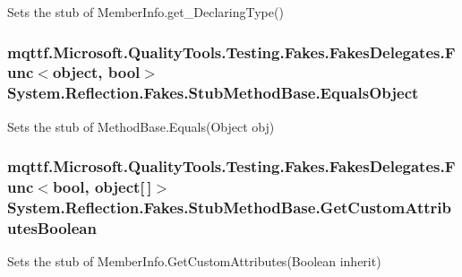 Sets the stub of Member\-Info.\-get\-\_\-\-Declaring\-Type()

\hypertarget{class_system_1_1_reflection_1_1_fakes_1_1_stub_method_base_a84e14ca18193fe6f46b067331e2e2517}{
\subsubsection[{Equals\-Object}]{\setlength{\rightskip}{0pt plus 5cm}mqttf.\-Microsoft.\-Quality\-Tools.\-Testing.\-Fakes.\-Fakes\-Delegates.\-Func$<$object, bool$>$ System.\-Reflection.\-Fakes.\-Stub\-Method\-Base.\-Equals\-Object}}\label{class_system_1_1_reflection_1_1_fakes_1_1_stub_method_base_a84e14ca18193fe6f46b067331e2e2517}


Sets the stub of Method\-Base.\-Equals(\-Object obj)

\hypertarget{class_system_1_1_reflection_1_1_fakes_1_1_stub_method_base_a47392a9d2d8944b9ec532f8330a71e78}{
\subsubsection[{Get\-Custom\-Attributes\-Boolean}]{\setlength{\rightskip}{0pt plus 5cm}mqttf.\-Microsoft.\-Quality\-Tools.\-Testing.\-Fakes.\-Fakes\-Delegates.\-Func$<$bool, object\mbox{[}$\,$\mbox{]}$>$ System.\-Reflection.\-Fakes.\-Stub\-Method\-Base.\-Get\-Custom\-Attributes\-Boolean}}\label{class_system_1_1_reflection_1_1_fakes_1_1_stub_method_base_a47392a9d2d8944b9ec532f8330a71e78}


Sets the stub of Member\-Info.\-Get\-Custom\-Attributes(\-Boolean inherit)

